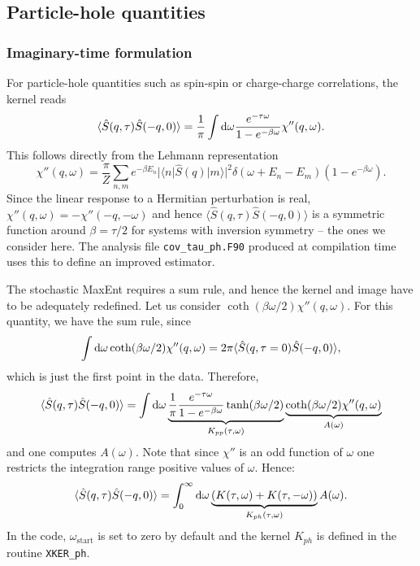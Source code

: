 \subsection{Particle-hole quantities }

\noindent
\subsubsection*{Imaginary-time formulation}
 For particle-hole quantities such as spin-spin or charge-charge correlations, 
the kernel reads
\begin{equation}
	\langle \hat{S}(q,\tau) \hat{S}(-q,0) \rangle  = \frac{1}{\pi} 
   \int \mathrm{d} \omega  \frac{e^{- \tau \omega} }{ 1 - e^{-\beta  \omega} } \chi''(q,\omega).
\end{equation}
This follows directly from the  Lehmann representation
\begin{equation}
 \chi''(q,\omega)  = \frac{\pi}{Z} \sum_{n,m} e^{-\beta E_n} |\langle n | \hat{S}(q) | m \rangle |^2 
\delta ( \omega + E_n - E_m) \left( 1 - e^{-\beta  \omega} \right) .
\end{equation}
Since the linear response to a Hermitian perturbation  is real, $\chi''(q,\omega)  = - \chi''(-q,-\omega)$ and hence $\langle \hat{S}(q,\tau) \hat{S}(-q,0) \rangle $ is a symmetric function around $\beta= \tau/2$ for systems with inversion symmetry -- the ones we consider here. The analysis file \texttt{cov\_tau\_ph.F90} produced at compilation time uses this to define an improved estimator. 

The  stochastic MaxEnt requires a sum rule, and hence the kernel and image have to be adequately redefined. 
Let us consider $\coth(\beta \omega/2) \chi''(q,\omega)$. For this quantity, we have the sum rule, since
\begin{equation}
	\int \mathrm{d} \omega 	\coth(\beta \omega/2) \chi''(q,\omega) = 
  2 \pi \langle \hat{S}(q,\tau=0) \hat{S}(-q,0) \rangle ,
\end{equation}
which is just the first point in the data. Therefore,
\begin{equation}
	\langle \hat{S}(q,\tau) \hat{S}(-q,0) \rangle  =  
       \int \mathrm{d} \omega  \underbrace{ \frac{1}{\pi} \frac{e^{- \tau \omega} }
            { 1 - e^{-\beta  \omega} } \tanh(\beta \omega/2)  }_{K_{pp}(\tau,\omega)} 
       \underbrace{ \coth(\beta \omega/2)   \chi''(q,\omega) }_{A(\omega)} 
\label{Kpp.eq}
\end{equation}
and one  computes $A(\omega)$. Note that since $\chi'' $ is an odd function of $\omega$  one restricts the integration range  positive values of $\omega$. 
Hence: 
\begin{equation}
	\langle \hat{S}(q,\tau) \hat{S}(-q,0) \rangle  =  
       \int_{0}^{\infty}  \mathrm{d} \omega \underbrace{\left( K(\tau,\omega)  + K(\tau,-\omega) \right)}_{K_{ph}(\tau,\omega)}  A(\omega).
\end{equation}
In the code, $\omega_\mathrm{start}$ is set to zero by default and the kernel $K_{ph}$ is defined in the  routine \texttt{XKER\_ph}.

